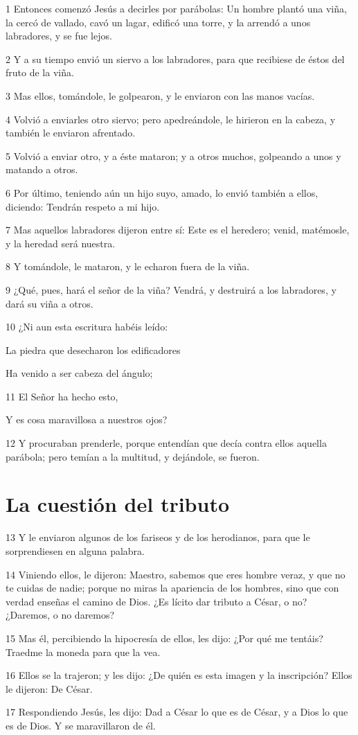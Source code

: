 \par 1 Entonces comenzó Jesús a decirles por parábolas: Un hombre plantó una viña, la cercó de vallado, cavó un lagar, edificó una torre, y la arrendó a unos labradores, y se fue lejos.
\par 2 Y a su tiempo envió un siervo a los labradores, para que recibiese de éstos del fruto de la viña.
\par 3 Mas ellos, tomándole, le golpearon, y le enviaron con las manos vacías.
\par 4 Volvió a enviarles otro siervo; pero apedreándole, le hirieron en la cabeza, y también le enviaron afrentado.
\par 5 Volvió a enviar otro, y a éste mataron; y a otros muchos, golpeando a unos y matando a otros.
\par 6 Por último, teniendo aún un hijo suyo, amado, lo envió también a ellos, diciendo: Tendrán respeto a mi hijo.
\par 7 Mas aquellos labradores dijeron entre sí: Este es el heredero; venid, matémosle, y la heredad será nuestra.
\par 8 Y tomándole, le mataron, y le echaron fuera de la viña.
\par 9 ¿Qué, pues, hará el señor de la viña? Vendrá, y destruirá a los labradores, y dará su viña a otros.
\par 10 ¿Ni aun esta escritura habéis leído:
\par La piedra que desecharon los edificadores
\par Ha venido a ser cabeza del ángulo;
\par 11 El Señor ha hecho esto,
\par Y es cosa maravillosa a nuestros ojos?
\par 12 Y procuraban prenderle, porque entendían que decía contra ellos aquella parábola; pero temían a la multitud, y dejándole, se fueron.

\section*{La cuestión del tributo}

\par 13 Y le enviaron algunos de los fariseos y de los herodianos, para que le sorprendiesen en alguna palabra.
\par 14 Viniendo ellos, le dijeron: Maestro, sabemos que eres hombre veraz, y que no te cuidas de nadie; porque no miras la apariencia de los hombres, sino que con verdad enseñas el camino de Dios. ¿Es lícito dar tributo a César, o no? ¿Daremos, o no daremos?
\par 15 Mas él, percibiendo la hipocresía de ellos, les dijo: ¿Por qué me tentáis? Traedme la moneda para que la vea.
\par 16 Ellos se la trajeron; y les dijo: ¿De quién es esta imagen y la inscripción? Ellos le dijeron: De César.
\par 17 Respondiendo Jesús, les dijo: Dad a César lo que es de César, y a Dios lo que es de Dios. Y se maravillaron de él.

